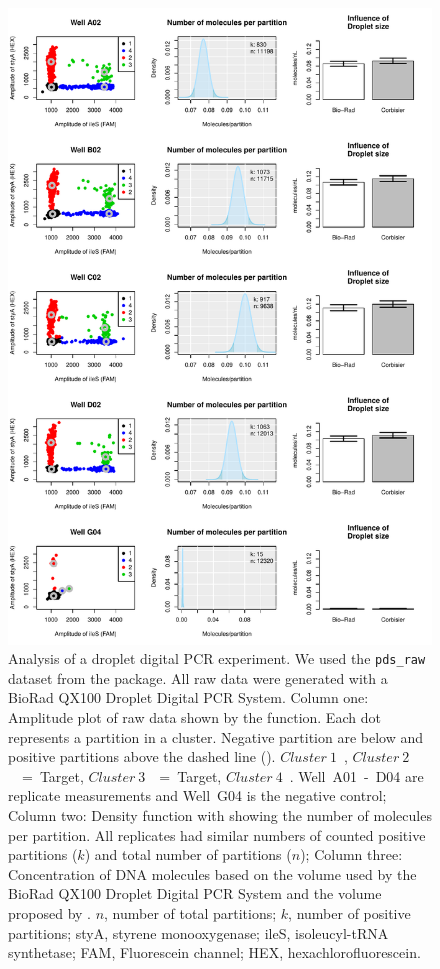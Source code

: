\begin{figure}[htbp]
\centering
  \includegraphics[clip=true, trim=0.1cm 0.4cm 0.7cm 0.3cm, width=12cm]{figures/dpcR_bioamp.pdf}
    \caption{Analysis of a droplet digital PCR experiment. We used the 
\texttt{pds\_raw} dataset from the  package. All raw data were 
generated with a BioRad QX100 Droplet Digital PCR System. Column one: Amplitude 
plot of raw data shown by the  function. Each dot represents a 
partition in a cluster. Negative partition are below and positive partitions above the 
dashed line ({\textbf{\textendash\textendash}}). 
$Cluster~1$~\textcolor{black}{\textbf{\textbullet}}, 
$Cluster~2$~\textcolor{red}{\textbf{\textbullet}}~=~Target, 
$Cluster~3$~\textcolor{green}{\textbf{\textbullet}}~=~Target, 
$Cluster~4$~\textcolor{blue}{\textbf{\textbullet}}. Well~A01~-~D04 are 
replicate measurements and Well~G04 is the negative control; Column two: Density 
function with showing the number of molecules per partition. All replicates had 
similar numbers of counted positive partitions ($k$) and total number of 
partitions ($n$); Column three: Concentration of DNA molecules based on the 
volume used by the BioRad QX100 Droplet Digital PCR System and the volume 
proposed by \citet{corbisier_2015}. $n$, number of total partitions; $k$, number 
of positive partitions; styA, styrene monooxygenase; ileS, isoleucyl-tRNA 
synthetase; FAM, Fluorescein channel; HEX, hexachlorofluorescein. 
    }  \label{figure:dpcR_bioamp}
\end{figure}

